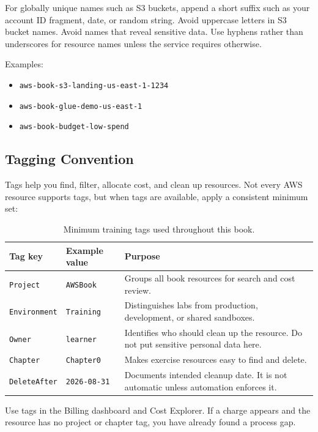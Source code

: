 For globally unique names such as S3 buckets, append a short suffix such as your account ID fragment, date, or random string. Avoid uppercase letters in S3 bucket names. Avoid names that reveal sensitive data. Use hyphens rather than underscores for resource names unless the service requires otherwise.

Examples:
\begin{itemize}
    \item \texttt{aws-book-s3-landing-us-east-1-1234}
    \item \texttt{aws-book-glue-demo-us-east-1}
    \item \texttt{aws-book-budget-low-spend}
\end{itemize}

\subsection{Tagging Convention}
Tags help you find, filter, allocate cost, and clean up resources. Not every AWS resource supports tags, but when tags are available, apply a consistent minimum set:

\begin{table}[H]
\centering
\small
\begin{tabular}{@{}p{3.4cm}p{4.2cm}p{5.7cm}@{}}
\toprule
\textbf{Tag key} & \textbf{Example value} & \textbf{Purpose} \\
\midrule
\texttt{Project} & \texttt{AWSBook} & Groups all book resources for search and cost review. \\
\texttt{Environment} & \texttt{Training} & Distinguishes labs from production, development, or shared sandboxes. \\
\texttt{Owner} & \texttt{learner} & Identifies who should clean up the resource. Do not put sensitive personal data here. \\
\texttt{Chapter} & \texttt{Chapter0} & Makes exercise resources easy to find and delete. \\
\texttt{DeleteAfter} & \texttt{2026-08-31} & Documents intended cleanup date. It is not automatic unless automation enforces it. \\
\bottomrule
\end{tabular}
\caption{Minimum training tags used throughout this book.}
\label{tab:chapter0-tags}
\end{table}

\begin{tipbox}
Use tags in the Billing dashboard and Cost Explorer. If a charge appears and the resource has no project or chapter tag, you have already found a process gap.
\end{tipbox}


